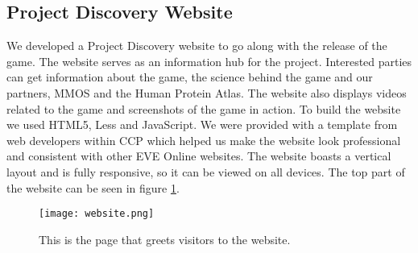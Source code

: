 \subsection{Project Discovery Website}
	We developed a Project Discovery website to go along with the release of the game. The website serves as an information hub for the project. Interested parties can get information about the game, the science behind the game and our partners, MMOS and the Human Protein Atlas. The website also displays videos related to the game and screenshots of the game in action. To build the website we used HTML5, Less and JavaScript. We were provided with a template from web developers within CCP which helped us make the website look professional and consistent with other EVE Online websites. The website boasts a vertical layout and is fully responsive, so it can be viewed on all devices. The top part of the website can be seen in figure \ref{fig:website}.

	\begin{figure}[H]
	  \centering
	  \graphicspath{ {./graphics/} }
	  \centerline{\texttt{[image: website.png]}}
	  \caption{\label{fig:website} This is the page that greets visitors to the website.}
	\end{figure}
